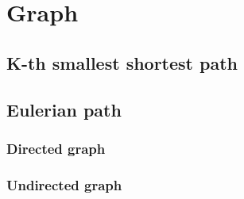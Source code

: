 \section{Graph}

\subsection{K-th smallest shortest path}

\subsection{Eulerian path}
	\subsubsection{Directed graph}
	\subsubsection{Undirected graph}

